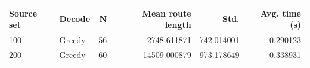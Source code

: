 \begin{tabular}{llrrrr}\toprule
Source set & Decode & N & Mean route length & Std. & Avg. time (s) \\
\midrule
100 & Greedy & 56 & 2748.611871 & 742.014001 & 0.290123 \\
200 & Greedy & 60 & 14509.000879 & 973.178649 & 0.338931 \\
\bottomrule\end{tabular}
